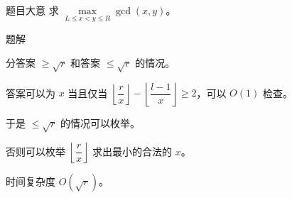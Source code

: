 \begin{frame}{题目大意}
	求 $\max\limits_{L\leq x<y\leq R}\gcd(x,y)$。
\end{frame}

\begin{frame}{题解}

分答案 $\geq \sqrt r$ 和答案 $\leq \sqrt r$ 的情况。\pause

答案可以为 $x$ 当且仅当 $\left\lfloor \dfrac{r}{x}\right\rfloor-\left\lfloor \dfrac{l-1}{x}\right\rfloor\geq 2$，可以 $O(1)$ 检查。\pause

于是 $\leq \sqrt r$ 的情况可以枚举。\pause

否则可以枚举 $\left\lfloor \dfrac{r}{x}\right\rfloor$ 求出最小的合法的 $x$。\pause

时间复杂度 $O(\sqrt r)$。
	
\end{frame}